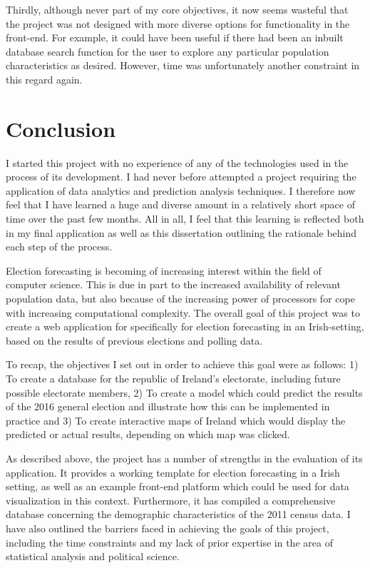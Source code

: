 Thirdly, although never part of my core objectives, it now seems wasteful that the project was not designed with more diverse options for functionality in the front-end. For example, it could have been useful if there had been an inbuilt database search function for the user to explore any particular population characteristics as desired. However, time was unfortunately another constraint in this regard again. 
\chapter{Conclusion}
I started this project with no experience of any of the technologies used in the process of its development. I had never before attempted a project requiring the application of data analytics and prediction analysis techniques. I therefore now feel that I have learned a huge and diverse amount in a relatively short space of time over the past few months. All in all, I feel that this learning is reflected both in my final application as well as this dissertation outlining the rationale behind each step of the process.  

Election forecasting is becoming of increasing interest within the field of computer science. This is due in part to the increased availability of relevant population data, but also because of the increasing power of processors for cope with increasing computational complexity.  The overall goal of this project was to create a web application for specifically for election forecasting in an Irish-setting, based on the results of previous elections and polling data. 

To recap, the objectives I set out in order to achieve this goal were as follows: 1) To create a database for the republic of Ireland's electorate, including future possible electorate members, 2) To create a model which could predict the results of the 2016 general election and illustrate how this can be implemented in practice and 3) To create interactive maps of Ireland which would display the predicted or actual results, depending on which map was clicked. 

As described above, the project has a number of strengths in the evaluation of its application. It provides a working template for election forecasting in a Irish setting, as well as an example front-end platform which could be used for data visualization in this context. Furthermore, it has compiled a comprehensive database concerning the demographic characteristics of the 2011 census data. 
I have also outlined the barriers faced in achieving the goals of this project, including the time  constraints and my lack of prior expertise in the area of statistical analysis and political science.
 

